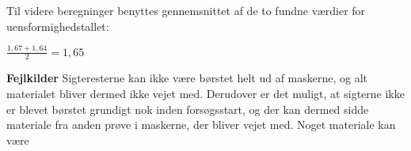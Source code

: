 Til videre beregninger benyttes gennemsnittet af de to fundne værdier for uensformighedstallet: 

\begin{center}
	$\frac{1,67+1,64}{2}=1,65$
\end{center}

\textbf{Fejlkilder}
\newline
Sigteresterne kan ikke være børstet helt ud af maskerne, og alt materialet bliver dermed ikke vejet med. Derudover er det muligt, at sigterne ikke er blevet børstet grundigt nok inden forsøgsstart, og der kan dermed sidde materiale fra anden prøve i maskerne, der bliver vejet med.
\newline
Noget materiale kan være 
\newline



